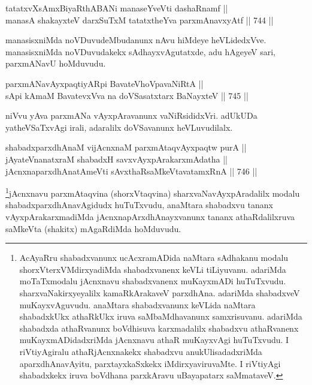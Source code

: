 \begin{shl}
tatatxvXsAmxBiyaRthA\s BANi manaseYveVti dashaRnamf || \\
manasA shakayxteV darxSuTxM tatatxtheYva parxmAnavxyAtf \hfill || 744 ||  
\end{shl}	

\begin{artha} 
manasisxniMda noVDuvudeMbudanunx nAvu hiMdeye heVLidedxVve. manasisxniMda noVDuvudakekx sAdhayxvAgutatxde, adu hAgeyeV sari, parxmANavU hoMduvudu.
\end{artha}


\begin{shl}
parxmANavAyxpaqtiyAR\s pi BavateVhoVpavaNiRtA || \\
sA\s pi kAmaM BavatevxVva na doVSasatxtarx BaNayxteV \hfill || 745 || 
\end{shl}

\begin{artha} 
niVvu yAva parxmANa vAyxpAravanunx vaNiRsididxVri. adUkUDa yatheVSaTxvAgi irali, adaralilx doVSavanunx heVLuvudilalx.
\end{artha}

\begin{shl}
shabadxparxdhAnaM vijAcnxnaM parxmAtaqvAyxpaqtw purA || \\
jAyateV\s nanatxraM shabadxH savxvAyxpArakarxmAdatha || \\
jAcnxnaparxdhAnatAmeVti sAvxthaRsaMkeVtavatamxRnA \hfill || 746 ||  
\end{shl}

\begin{artha} 
\footnote{AcAyaRru shabadxvanunx ucAcxramADida naMtara sAdhakanu 
modalu shorxVterxVMdirxyadiMda shabadxvanenx keVLi tiLiyuvanu. 
adariMda moTaTxmodalu jAcnxnavu shabadxvanenx muKayxmADi huTuTxvudu. 
sharxvaNakirxyeyalilx kamaRkArakaveV parxdhAna. adariMda shabadxveV 
muKayxvAguvudu. anaMtara shabadxvanunx keVLida naMtara shabadxkUkx 
athaRkUkx iruva saMbaMdhavanunx samxrisuvanu. adariMda shabadxda 
athaRvanunx boVdhisuva karxmadalilx shabadxvu athaRvanenx 
muKayxmADidadxriMda jAcnxnavu athaR muKayxvAgi huTuTxvudu. I 
riVtiyAgiralu athaRjAcnxnakekx shabadxvu anukUlisadadxriMda 
aparxdhAnavAyitu, parxtayxkaSxkekx iMdirxyaviruvaMte. I riVtiyAgi 
shabadxkekx iruva boVdhana parxkAravu uBayapatarx 
saMmataveV.}jAcnxnavu parxmAtaqvina (shorxVtaqvina) 
sharxvaNavAyxpAradalilx modalu shabadxparxdhAnavAgidudx huTuTxvudu, 
anaMtara shabadxvu tananx vAyxpArakarxmadiMda jAcnxnapArxdhAnayxvanunx 
tananx athaRdalilxruva saMkeVta (shakitx) mAgaRdiMda hoMduvudu.
\end{artha}

